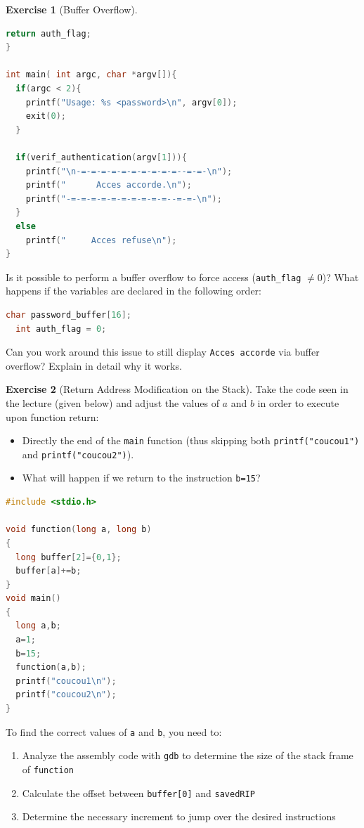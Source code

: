 \documentclass[a4paper,11pt]{article}
\theoremstyle{plain}
\theoremstyle{definition}
\newtheorem{exercice}{Exercise}
\begin{document}
\begin{exercice}[Buffer Overflow]
\begin{enumerate}
\begin{lstlisting}[language=C]
  return auth_flag;
}

int main( int argc, char *argv[]){
  if(argc < 2){
    printf("Usage: %s <password>\n", argv[0]);
    exit(0);
  }

  if(verif_authentication(argv[1])){
    printf("\n-=-=-=-=-=-=-=-=-=-=--=-=-\n");
    printf("      Acces accorde.\n");
    printf("-=-=-=-=-=-=-=-=-=-=--=-=-\n");
  }
  else
    printf("     Acces refuse\n");
}
\end{lstlisting}
Is it possible to perform a buffer overflow to force access (\texttt{auth\_flag} $\neq 0$)? What happens if the variables are declared in the following order:
\begin{lstlisting}[language=C,numbers=none]
  char password_buffer[16];
  int auth_flag = 0;
\end{lstlisting}
Can you work around this issue to still display \texttt{Acces accorde} via buffer overflow? Explain in detail why it works.
\end{enumerate}
\end{exercice}



\begin{exercice}[Return Address Modification on the Stack]
Take the code seen in the lecture (given below) and adjust the values of $a$ and $b$ in order to execute upon function return:
\begin{itemize}
\item Directly the end of the \texttt{main} function (thus skipping both \texttt{printf("coucou1")} and \texttt{printf("coucou2")}).
  \item What will happen if we return to the instruction \texttt{b=15}?
\end{itemize}

\begin{lstlisting}[language=C]
#include <stdio.h>

void function(long a, long b)
{
  long buffer[2]={0,1};
  buffer[a]+=b;
}
void main()
{
  long a,b;
  a=1;
  b=15;
  function(a,b);
  printf("coucou1\n");
  printf("coucou2\n");
}
\end{lstlisting}

\begin{rappel}
To find the correct values of \texttt{a} and \texttt{b}, you need to:
\begin{enumerate}
    \item Analyze the assembly code with \texttt{gdb} to determine the size of the stack frame of \texttt{function}
    \item Calculate the offset between \texttt{buffer[0]} and \texttt{savedRIP}
    \item Determine the necessary increment to jump over the desired instructions
\end{enumerate}
\end{rappel}
\end{exercice}
\end{document}
